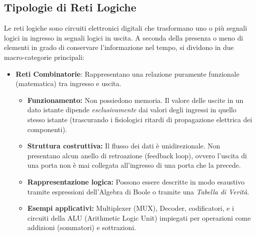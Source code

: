 \documentclass[12pt, a4paper]{article}
\begin{document}
\subsection{Tipologie di Reti Logiche}
Le reti logiche sono circuiti elettronici digitali che trasformano uno o più segnali logici in ingresso in segnali logici in uscita. A seconda della presenza o meno di elementi in grado di conservare l'informazione nel tempo, si dividono in due macro-categorie principali:

\begin{itemize}
    \item \textbf{Reti Combinatorie}: Rappresentano una relazione puramente funzionale (matematica) tra ingresso e uscita.
    \begin{itemize}
        \item \textbf{Funzionamento:} Non possiedono memoria. Il valore delle uscite in un dato istante dipende \textit{esclusivamente} dai valori degli ingressi in quello stesso istante (trascurando i fisiologici ritardi di propagazione elettrica dei componenti).
        \item \textbf{Struttura costruttiva:} Il flusso dei dati è unidirezionale. Non presentano alcun anello di retroazione (feedback loop), ovvero l'uscita di una porta non è mai collegata all'ingresso di una porta che la precede.
        \item \textbf{Rappresentazione logica:} Possono essere descritte in modo esaustivo tramite espressioni dell'Algebra di Boole o tramite una \textit{Tabella di Verità}.
        \item \textbf{Esempi applicativi:} Multiplexer (MUX), Decoder, codificatori, e i circuiti della ALU (Arithmetic Logic Unit) impiegati per operazioni come addizioni (sommatori) e sottrazioni.
    \end{itemize}
    

\end{itemize}
\end{document}
